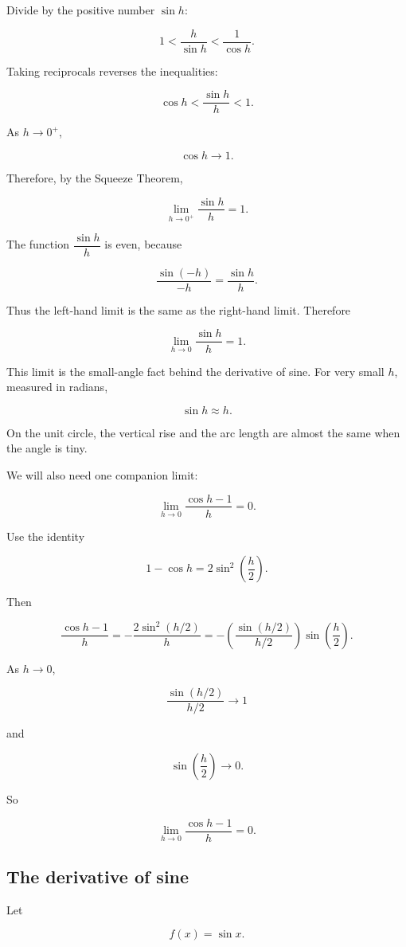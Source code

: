 Divide by the positive number \(\sin h\):

\[
1<\frac{h}{\sin h}<\frac1{\cos h}.
\]

Taking reciprocals reverses the inequalities:

\[
\cos h<\frac{\sin h}{h}<1.
\]

As \(h\to0^+\),

\[
\cos h\to1.
\]

Therefore, by the Squeeze Theorem,

\[
\lim_{h\to0^+}\frac{\sin h}{h}=1.
\]

The function \(\dfrac{\sin h}{h}\) is even, because

\[
\frac{\sin(-h)}{-h}=\frac{\sin h}{h}.
\]

Thus the left-hand limit is the same as the right-hand limit.  Therefore

\[
\boxed{
\lim_{h\to0}\frac{\sin h}{h}=1.
}
\]

This limit is the small-angle fact behind the derivative of sine.  For very small \(h\), measured in radians,

\[
\sin h\approx h.
\]

On the unit circle, the vertical rise and the arc length are almost the same when the angle is tiny.

We will also need one companion limit:

\[
\lim_{h\to0}\frac{\cos h-1}{h}=0.
\]

Use the identity

\[
1-\cos h=2\sin^2\left(\frac h2\right).
\]

Then

\[
\frac{\cos h-1}{h}
=
-\frac{2\sin^2(h/2)}{h}
=
-\left(\frac{\sin(h/2)}{h/2}\right)\sin\left(\frac h2\right).
\]

As \(h\to0\),

\[
\frac{\sin(h/2)}{h/2}\to1
\]

and

\[
\sin\left(\frac h2\right)\to0.
\]

So

\[
\boxed{
\lim_{h\to0}\frac{\cos h-1}{h}=0.
}
\]

\subsection{The derivative of sine}
\label{subsec:derivative-sine}

Let

\[
f(x)=\sin x.
\]


